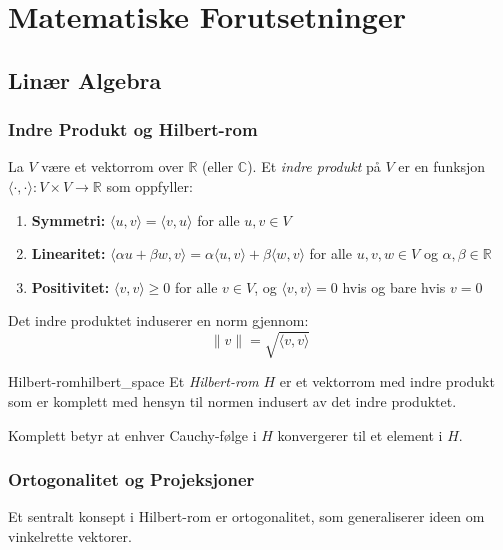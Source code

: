 \documentclass[../main.tex]{subfiles}
\begin{document}
\chapter{Matematiske Forutsetninger}
\label{chap:preliminaries}

\section{Linær Algebra}
\label{sec:linear_algebra}

\subsection{Indre Produkt og Hilbert-rom}
La $V$ være et vektorrom over $\mathbb{R}$ (eller $\mathbb{C}$). Et \emph{indre produkt} på $V$ er en funksjon $\langle \cdot, \cdot \rangle : V \times V \to \mathbb{R}$ som oppfyller:
\begin{enumerate}
	\item \textbf{Symmetri:} $\langle u, v \rangle = \langle v, u \rangle$ for alle $u, v \in V$
	\item \textbf{Linearitet:} $\langle \alpha u + \beta w, v \rangle = \alpha \langle u, v \rangle + \beta \langle w, v \rangle$ for alle $u, v, w \in V$ og $\alpha, \beta \in \mathbb{R}$
	\item \textbf{Positivitet:} $\langle v, v \rangle \geq 0$ for alle $v \in V$, og $\langle v, v \rangle = 0$ hvis og bare hvis $v = 0$
\end{enumerate}

Det indre produktet induserer en norm gjennom:
\begin{equation}
	\|v\| = \sqrt{\langle v, v \rangle}
\end{equation}

\begin{definition}{Hilbert-rom}{hilbert_space}
	Et \emph{Hilbert-rom} $H$ er et vektorrom med indre produkt som er komplett med hensyn til normen indusert av det indre produktet.

	Komplett betyr at enhver Cauchy-følge i $H$ konvergerer til et element i $H$.
\end{definition}

\subsection{Ortogonalitet og Projeksjoner}

Et sentralt konsept i Hilbert-rom er ortogonalitet, som generaliserer ideen om vinkelrette vektorer.
\end{document}
